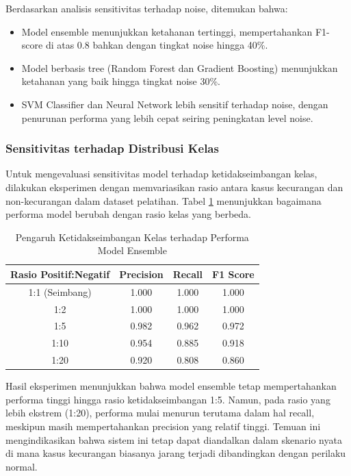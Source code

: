 Berdasarkan analisis sensitivitas terhadap noise, ditemukan bahwa:

\begin{itemize}
    \item Model ensemble menunjukkan ketahanan tertinggi, mempertahankan F1-score di atas 0.8 bahkan dengan tingkat noise hingga 40\%.
    \item Model berbasis tree (Random Forest dan Gradient Boosting) menunjukkan ketahanan yang baik hingga tingkat noise 30\%.
    \item SVM Classifier dan Neural Network lebih sensitif terhadap noise, dengan penurunan performa yang lebih cepat seiring peningkatan level noise.
\end{itemize}

\subsubsection{Sensitivitas terhadap Distribusi Kelas}

Untuk mengevaluasi sensitivitas model terhadap ketidakseimbangan kelas, dilakukan eksperimen dengan memvariasikan rasio antara kasus kecurangan dan non-kecurangan dalam dataset pelatihan. Tabel \ref{tabel:classImbalance} menunjukkan bagaimana performa model berubah dengan rasio kelas yang berbeda.

\begin{table}[htbp]
\centering
\caption{Pengaruh Ketidakseimbangan Kelas terhadap Performa Model Ensemble}
\label{tabel:classImbalance}
\begin{tabular}{|c|c|c|c|}
\hline
\textbf{Rasio Positif:Negatif} & \textbf{Precision} & \textbf{Recall} & \textbf{F1 Score} \\
\hline
1:1 (Seimbang) & 1.000 & 1.000 & 1.000 \\
\hline
1:2 & 1.000 & 1.000 & 1.000 \\
\hline
1:5 & 0.982 & 0.962 & 0.972 \\
\hline
1:10 & 0.954 & 0.885 & 0.918 \\
\hline
1:20 & 0.920 & 0.808 & 0.860 \\
\hline
\end{tabular}
\end{table}

Hasil eksperimen menunjukkan bahwa model ensemble tetap mempertahankan performa tinggi hingga rasio ketidakseimbangan 1:5. Namun, pada rasio yang lebih ekstrem (1:20), performa mulai menurun terutama dalam hal recall, meskipun masih mempertahankan precision yang relatif tinggi. Temuan ini mengindikasikan bahwa sistem ini tetap dapat diandalkan dalam skenario nyata di mana kasus kecurangan biasanya jarang terjadi dibandingkan dengan perilaku normal.

